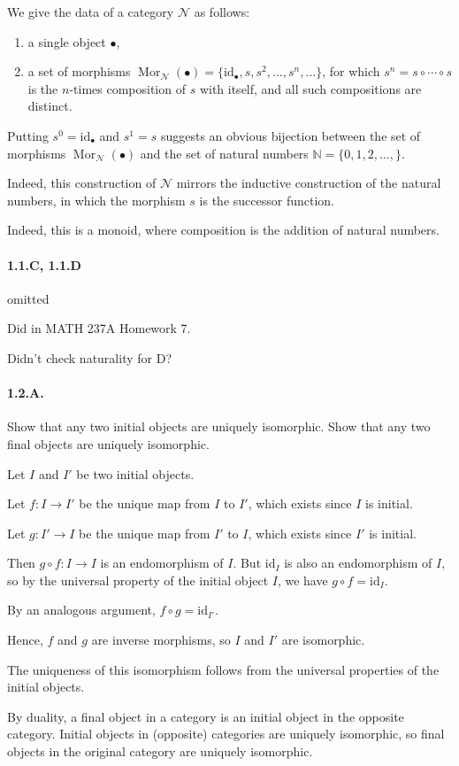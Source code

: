 \documentclass[12pt]{article}
\newlength{\myparskip}
\newenvironment{fullbox}{\begin{lrbox}{\savefullbox}\begin{minipage}{\dimexpr\textwidth-2\fboxsep\relax}\setlength{\parskip}{\myparskip}}{\end{minipage}\end{lrbox}\framebox[\textwidth]{\usebox{\savefullbox}}}
\newenvironment{pbox}[1][]{\begin{fullbox}\def\temp{#1}\ifx\temp\empty\else\paragraph{#1}\phantom{}\fi}{\end{fullbox}}
\theoremstyle{definition}
\newcommand{\<}{\langle}
\renewcommand{\>}{\rangle}
\newcommand{\id}{\mathrm{id}} %
\DeclareMathOperator{\Mor}{Mor}
\newcommand{\N}{\mathbb{N}}
\newcommand{\NN}{\mathcal{N}}
\newcommand{\obj}{\bullet}
\begin{document}
We give the data of a category $\NN$ as follows:
\begin{enumerate}[1.]
    \item a single object $\obj$,
    \item a set of morphisms $\Mor_\NN(\obj) = \{\id_\obj, s, s^2, \dots, s^n, \dots\}$, for which $s^n = s \circ \cdots \circ s$ is the $n$-times composition of $s$ with itself, and all such compositions are distinct.
\end{enumerate}

Putting $s^0 = \id_\obj$ and $s^1 = s$ suggests an obvious bijection between the set of morphisms $\Mor_\NN(\obj)$ and the set of natural numbers $\N = \{0, 1, 2, \dots,\}$.

Indeed, this construction of $\NN$ mirrors the inductive construction of the natural numbers, in which the morphism $s$ is the successor function.

Indeed, this is a monoid, where composition is the addition of natural numbers.

\begin{pbox}[1.1.C, 1.1.D]
    omitted
\end{pbox}

Did in MATH 237A Homework 7.

Didn't check naturality for D?


\begin{pbox}[1.2.A.]
    Show that any two initial objects are uniquely isomorphic.
    Show that any two final objects are uniquely isomorphic.
\end{pbox}

Let $I$ and $I'$ be two initial objects.

Let $f : I \to I'$ be the unique map from $I$ to $I'$, which exists since $I$ is initial.

Let $g : I' \to I$ be the unique map from $I'$ to $I$, which exists since $I'$ is initial.

Then $g \circ f : I \to I$ is an endomorphism of $I$.
But $\id_I$ is also an endomorphism of $I$, so by the universal property of the initial object $I$, we have $g \circ f = \id_I$.

By an analogous argument, $f \circ g = \id_{I'}$.

Hence, $f$ and $g$ are inverse morphisms, so $I$ and $I'$ are isomorphic.

The uniqueness of this isomorphism follows from the universal properties of the initial objects.

By duality, a final object in a category is an initial object in the opposite category.
Initial objects in (opposite) categories are uniquely isomorphic, so final objects in the original category are uniquely isomorphic.
\end{document}
